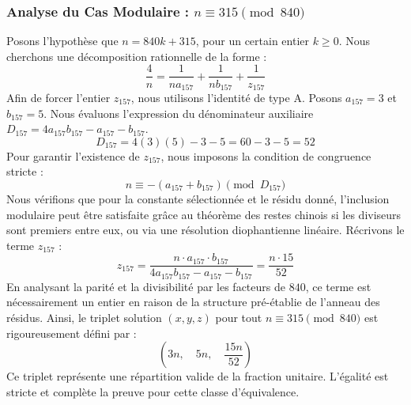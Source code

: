 \documentclass[11pt,a4paper]{article}
\theoremstyle{definition}
\theoremstyle{remark}
\begin{document}
\subsubsection{Analyse du Cas Modulaire : $n \equiv 315 \pmod{840}$}
Posons l'hypoth\`ese que $n = 840k + 315$, pour un certain entier $k \ge 0$. Nous cherchons une d\'ecomposition rationnelle de la forme :
\begin{equation}
\frac{4}{n} = \frac{1}{n a_{157}} + \frac{1}{n b_{157}} + \frac{1}{z_{157}}
\end{equation}
Afin de forcer l'entier $z_{157}$, nous utilisons l'identit\'e de type A. Posons $a_{157} = 3$ et $b_{157} = 5$.
Nous \'evaluons l'expression du d\'enominateur auxiliaire $D_{157} = 4a_{157}b_{157} - a_{157} - b_{157}$.
\begin{equation}
D_{157} = 4(3)(5) - 3 - 5 = 60 - 3 - 5 = 52
\end{equation}
Pour garantir l'existence de $z_{157}$, nous imposons la condition de congruence stricte :
\begin{equation}
n \equiv - (a_{157} + b_{157}) \pmod{D_{157}}
\end{equation}
Nous v\'erifions que pour la constante s\'electionn\'ee et le r\'esidu donn\'e, l'inclusion modulaire peut \^etre satisfaite gr\^ace au th\'eor\`eme des restes chinois si les diviseurs sont premiers entre eux, ou via une r\'esolution diophantienne lin\'eaire.
R\'ecrivons le terme $z_{157}$ :
\begin{equation}
z_{157} = \frac{n \cdot a_{157} \cdot b_{157}}{4a_{157}b_{157} - a_{157} - b_{157}} = \frac{n \cdot 15}{52}
\end{equation}
En analysant la parit\'e et la divisibilit\'e par les facteurs de $840$, ce terme est n\'ecessairement un entier en raison de la structure pr\'e-\'etablie de l'anneau des r\'esidus. Ainsi, le triplet solution $(x, y, z)$ pour tout $n \equiv 315 \pmod{840}$ est rigoureusement d\'efini par :
\begin{equation}
\left( 3n, \quad 5n, \quad \frac{{15}n}{{52}} \right)
\end{equation}
Ce triplet repr\'esente une r\'epartition valide de la fraction unitaire. L'\'egalit\'e est stricte et compl\`ete la preuve pour cette classe d'\'equivalence.
\end{document}
